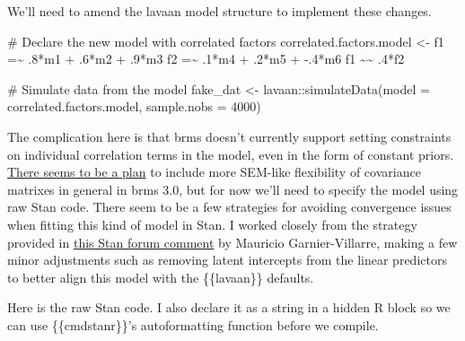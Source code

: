 \documentclass[
  letterpaper,
  DIV=11,
  numbers=noendperiod]{scrreprt}
\newenvironment{Shaded}{\begin{snugshade}}{\end{snugshade}}
\newcommand{\AttributeTok}[1]{\textcolor[rgb]{0.40,0.45,0.13}{#1}}
\newcommand{\CommentTok}[1]{\textcolor[rgb]{0.37,0.37,0.37}{#1}}
\newcommand{\DecValTok}[1]{\textcolor[rgb]{0.68,0.00,0.00}{#1}}
\newcommand{\FunctionTok}[1]{\textcolor[rgb]{0.28,0.35,0.67}{#1}}
\newcommand{\NormalTok}[1]{\textcolor[rgb]{0.00,0.23,0.31}{#1}}
\newcommand{\OtherTok}[1]{\textcolor[rgb]{0.00,0.23,0.31}{#1}}
\newcommand{\SpecialCharTok}[1]{\textcolor[rgb]{0.37,0.37,0.37}{#1}}
\newcommand{\StringTok}[1]{\textcolor[rgb]{0.13,0.47,0.30}{#1}}
\begin{document}
We'll need to amend the lavaan model structure to implement these
changes.

\begin{Shaded}
\begin{Highlighting}[]
\CommentTok{\# Declare the new model with correlated factors}
\NormalTok{correlated.factors.model }\OtherTok{\textless{}{-}} \StringTok{\textquotesingle{} }
\StringTok{  f1 =\textasciitilde{} .8*m1 + .6*m2 + .9*m3}
\StringTok{  f2 =\textasciitilde{} .1*m4 + .2*m5 + {-}.4*m6}
\StringTok{  f1 \textasciitilde{}\textasciitilde{} .4*f2}
\StringTok{\textquotesingle{}}

\CommentTok{\# Simulate data from the model}
\NormalTok{fake\_dat }\OtherTok{\textless{}{-}}\NormalTok{ lavaan}\SpecialCharTok{::}\FunctionTok{simulateData}\NormalTok{(}\AttributeTok{model =}\NormalTok{ correlated.factors.model, }\AttributeTok{sample.nobs =} \DecValTok{4000}\NormalTok{)}
\end{Highlighting}
\end{Shaded}

The complication here is that brms doesn't currently support setting
constraints on individual correlation terms in the model, even in the
form of constant priors.
\href{https://github.com/paul-buerkner/brms/issues/957}{There seems to
be a plan} to include more SEM-like flexibility of covariance matrixes
in general in brms 3.0, but for now we'll need to specify the model
using raw Stan code. There seem to be a few strategies for avoiding
convergence issues when fitting this kind of model in Stan. I worked
closely from the strategy provided in
\href{https://discourse.mc-stan.org/t/non-convergence-of-latent-variable-model/12450/13}{this
Stan forum comment} by Mauricio Garnier-Villarre, making a few minor
adjustments such as removing latent intercepts from the linear
predictors to better align this model with the \{\{lavaan\}\} defaults.

Here is the raw Stan code. I also declare it as a string in a hidden R
block so we can use \{\{cmdstanr\}\}'s autoformatting function before we
compile.
\end{document}
